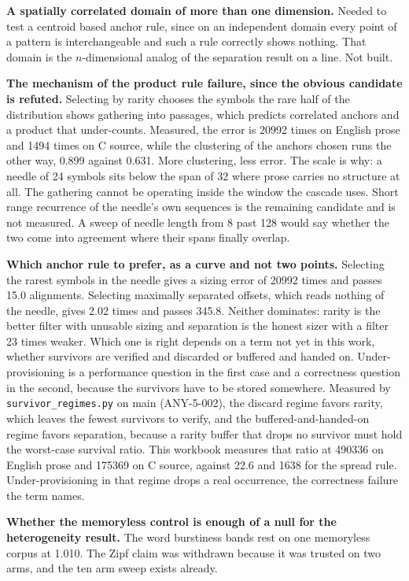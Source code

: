 \textbf{A spatially correlated domain of more than one dimension.} Needed to test a centroid based anchor rule, since on an independent domain every point of a pattern is interchangeable and such a rule correctly shows nothing. That domain is the \(n\)-dimensional analog of the separation result on a line. Not built.

\textbf{The mechanism of the product rule failure, since the obvious candidate is refuted.} Selecting by rarity chooses the symbols the rare half of the distribution shows gathering into passages, which predicts correlated anchors and a product that under-counts. Measured, the error is 20992 times on English prose and 1494 times on C source, while the clustering of the anchors chosen runs the other way, 0.899 against 0.631. More clustering, less error. The scale is why: a needle of 24 symbols sits below the span of 32 where prose carries no structure at all. The gathering cannot be operating inside the window the cascade uses. Short range recurrence of the needle's own sequences is the remaining candidate and is not measured. A sweep of needle length from 8 past 128 would say whether the two come into agreement where their spans finally overlap.

\textbf{Which anchor rule to prefer, as a curve and not two points.} Selecting the rarest symbols in the needle gives a sizing error of 20992 times and passes 15.0 alignments. Selecting maximally separated offsets, which reads nothing of the needle, gives 2.02 times and passes 345.8. Neither dominates: rarity is the better filter with unusable sizing and separation is the honest sizer with a filter 23 times weaker. Which one is right depends on a term not yet in this work, whether survivors are verified and discarded or buffered and handed on. Under-provisioning is a performance question in the first case and a correctness question in the second, because the survivors have to be stored somewhere. Measured by \texttt{survivor\_regimes.py} on main (ANY-5-002), the discard regime favors rarity, which leaves the fewest survivors to verify, and the buffered-and-handed-on regime favors separation, because a rarity buffer that drops no survivor must hold the worst-case survival ratio. This workbook measures that ratio at 490336 on English prose and 175369 on C source, against 22.6 and 1638 for the spread rule. Under-provisioning in that regime drops a real occurrence, the correctness failure the term names.

\textbf{Whether the memoryless control is enough of a null for the heterogeneity result.} The word burstiness bands rest on one memoryless corpus at 1.010. The Zipf claim was withdrawn because it was trusted on two arms, and the ten arm sweep exists already.

